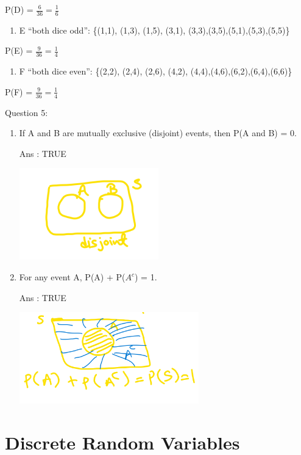 \documentclass[
]{book}
\providecommand{\tightlist}{%
  \setlength{\itemsep}{0pt}\setlength{\parskip}{0pt}}
\begin{document}
P(D) = \(\frac{6}{36}=\frac{1}{6}\)

\begin{enumerate}
\def\labelenumi{\alph{enumi})}
\setcounter{enumi}{4}
\tightlist
\item
  E ``both dice odd'': \{(1,1), (1,3), (1,5), (3,1), (3,3),(3,5),(5,1),(5,3),(5,5)\}
\end{enumerate}

P(E) = \(\frac{9}{36}=\frac{1}{4}\)

\begin{enumerate}
\def\labelenumi{\alph{enumi})}
\setcounter{enumi}{5}
\tightlist
\item
  F ``both dice even'': \{(2,2), (2,4), (2,6), (4,2), (4,4),(4,6),(6,2),(6,4),(6,6)\}
\end{enumerate}

P(F) = \(\frac{9}{36}=\frac{1}{4}\)

Question 5:

\begin{enumerate}
\def\labelenumi{\alph{enumi})}
\item
  If A and B are mutually exclusive (disjoint) events, then P(A and B) = 0.

  Ans : TRUE

  \includegraphics[width=2.375in,height=\textheight]{images/img17.png}
\item
  For any event A, P(A) + P(\(A^c\)) = 1.

  Ans : TRUE

  \includegraphics[width=3.0625in,height=\textheight]{images/img18.png}
\end{enumerate}

\chapter{Discrete Random Variables}\label{discrete-random-variables}
\end{document}
